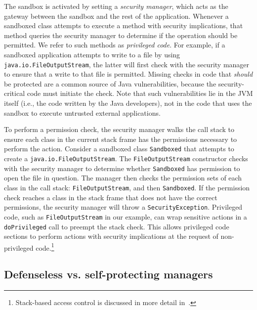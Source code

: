 \documentclass{sig-alternate}
\begin{document}
The sandbox is activated by setting a \emph{security manager}, which acts as the
gateway between the sandbox and the rest of the application. Whenever a
sandboxed class attempts to execute a method with security implications, that
method queries the security manager to determine if the operation should be
permitted.  We refer to such methods as \emph{privileged code}.  For example, if
a sandboxed application attempts to write to a file by using
\texttt{java.io.FileOutputStream}, the latter will first
check with the security manager to ensure that a write to that file is
permitted.  Missing checks in code that \emph{should} be protected are a common
source of Java vulnerabilities, because the security-critical code must initiate
the check.  Note that such vulnerabilities lie in the JVM itself (i.e., the code
written by the Java developers), not in the code that uses the sandbox to
execute untrusted external applications.

To perform a permission check, the security manager walks the call stack to
ensure each class in the current stack frame has the permissions necessary to
perform the action.  Consider a sandboxed class \texttt{Sandboxed} that attempts
to create a \texttt{java.io.FileOutputStream}. The \texttt{FileOutputStream}
constructor checks with the security manager to determine whether
\texttt{Sandboxed} has permission to open the file in question.  The manager
then checks the permission sets of each class in the call stack:
\texttt{FileOutputStream}, and then \texttt{Sandboxed}.  If the permission check
reaches a class in the stack frame that does not have the correct permissions,
the security manager will throw a \texttt{SecurityException}.  Privileged code,
such as \texttt{FileOutputStream} in our example, can wrap sensitive actions in
a \texttt{doPrivileged} call to preempt the stack check.  This allows privileged
code sections to perform actions with security implications at the request of
non-privileged code.\footnote{Stack-based access control is discussed in more
  detail
  in~\cite{banerjee_stack-based_2005,besson_stack_2004,d._s._wallach_understanding_1998,erlingsson_irm_2000,fournet_stack_2002,pistoia_beyond_2007,zhao_type_2005}.}

\subsection{Defenseless vs. self-protecting managers}
\label{sec:secmanagers}
\end{document}

